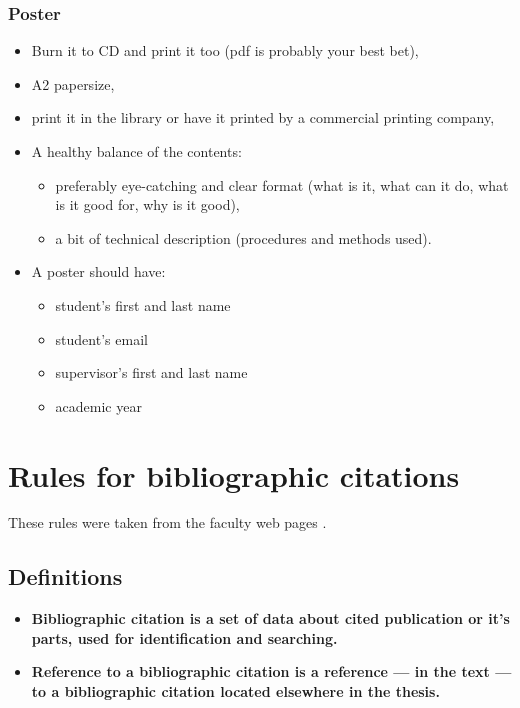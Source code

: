 {{\subsection*{Poster}
\begin{itemize}
  \item{Burn it to CD and print it too (pdf is probably your best bet),}
  \item{A2 papersize,}
  \item{print it in the library or have it printed by a commercial printing company,}
  \item{A healthy balance of the contents:
  \begin{itemize}
    \item{preferably eye-catching and clear format (what is it, what can it do, what is it good for, why is it good),}
    \item{a bit of technical description (procedures and methods used).}
  \end{itemize}}
  \item{A poster should have:}
  \begin{itemize}
  	\item{student's first and last name}
    \item{student's email}
    \item{supervisor's first and last name}
    \item{academic year}
  \end{itemize}
\end{itemize}

\chapter{Rules for bibliographic citations}
\label{citace}

These rules were taken from the faculty web pages \cite{citace}.

\section{Definitions}

\begin{itemize}
  \item{\bf Bibliographic citation \rm is a set of data about cited publication or it's parts, used for identification and searching.}
  \item{\bf Reference to a bibliographic citation \rm is a reference --- in the text --- to a bibliographic citation located elsewhere in the thesis.}
\end{itemize}

}}
